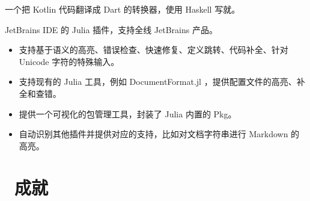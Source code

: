 \documentclass{resume}
\begin{document}
一个把 Kotlin 代码翻译成 Dart 的转换器，使用 Haskell 写就。

JetBrains IDE 的 Julia 插件，支持全线 JetBrains 产品。
\begin{itemize}
  \item 支持基于语义的高亮、错误检查、快速修复、定义跳转、代码补全、针对 Unicode 字符的特殊输入。
  \item 支持现有的 Julia 工具，例如 DocumentFormat.jl ，提供配置文件的高亮、补全和查错。
  \item 提供一个可视化的包管理工具，封装了 Julia 内置的 Pkg。
  \item 自动识别其他插件并提供对应的支持，比如对文档字符串进行 Markdown 的高亮。
\end{itemize}


\section{\faHeartO\ 成就}
\end{document}
